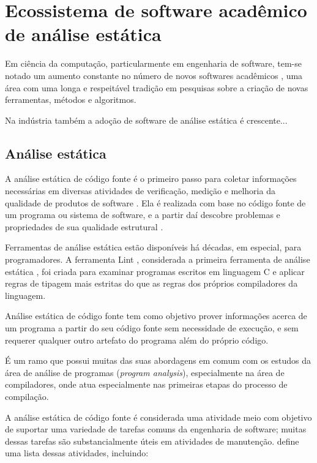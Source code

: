 \section{Ecossistema de software acadêmico de análise estática} \label{analise-estatica}

Em ciência da computação, particularmente em engenharia de software, tem-se
notado um aumento constante no número de novos softwares acadêmicos
\cite{allen2017engineering}, uma área com uma longa e respeitável tradição em
pesquisas sobre a criação de novas ferramentas, métodos e algoritmos.

Na indústria também a adoção de software de análise estática é crescente...

\subsection{Análise estática}

A análise estática de código fonte é o primeiro passo para coletar informações
necessárias em diversas atividades de verificação, medição e melhoria da
qualidade de produtos de software \cite{Cruz2009, Kirkov2010}. Ela é
realizada com base no código fonte de um programa ou sistema de software, e a
partir daí descobre problemas e propriedades de sua qualidade estrutural
\cite{Chess2007}.

Ferramentas de análise estática estão disponíveis há décadas, em especial,
para programadores. A ferramenta Lint \cite{Johnson1978}, considerada a
primeira ferramenta de análise estática \cite{Gosain2015}, foi criada para
examinar programas escritos em linguagem C e aplicar regras de tipagem mais
estritas do que as regras dos próprios compiladores da linguagem.

Análise estática de código fonte tem como objetivo prover
informações acerca de um programa a partir do seu código fonte sem
necessidade de execução, e sem requerer qualquer outro artefato do programa
além do próprio código.

É um ramo que possui muitas das suas abordagens em comum com os estudos da
área de análise de programas ({\it program analysis}), especialmente na área de
compiladores, onde atua especialmente nas primeiras etapas do processo de compilação.

A análise estática de código fonte é considerada uma atividade meio com
objetivo de suportar uma variedade de tarefas comuns da engenharia de
software; muitas dessas tarefas são substancialmente úteis em atividades de
manutenção.  define uma lista dessas
atividades, incluindo:

